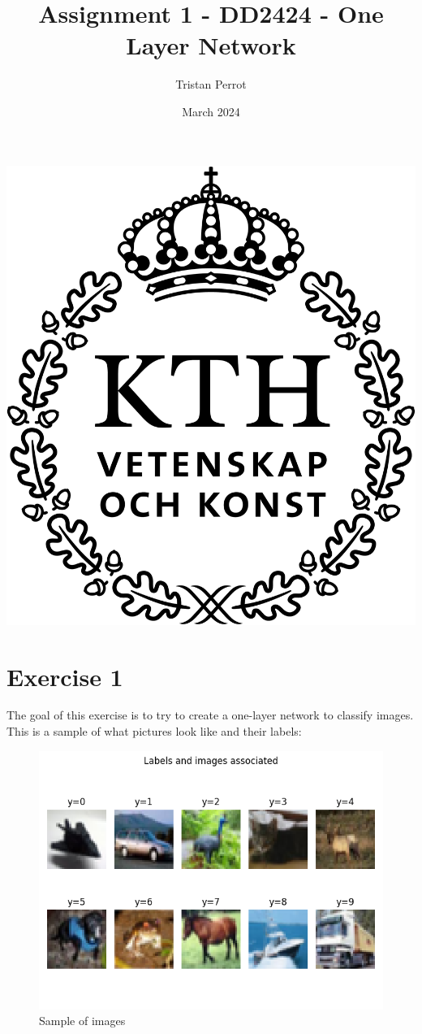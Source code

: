 \documentclass{article}
\title{Assignment 1 - DD2424 - One Layer Network}
\author{Tristan Perrot}
\date{March 2024}
\begin{document}
\maketitle
\begin{center}
    \includegraphics[scale=0.25]{images/KTH_logo_RGB_svart.png}
\end{center}

\section{Exercise 1}

The goal of this exercise is to try to create a one-layer network to classify images. This is a sample of what pictures look like and their labels:
\begin{figure}[h!]
    \centering
    \includegraphics[scale=0.5]{Result_Pics/labels_images.png}
    \caption{Sample of images}
\end{figure}
\end{document}
